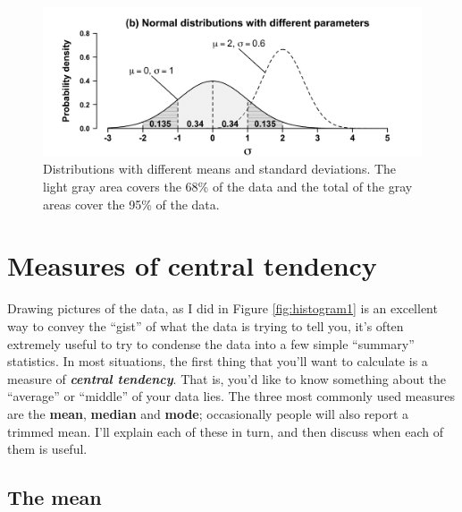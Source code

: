 \documentclass[
]{book}
\begin{document}
\begin{figure}
\centering
\includegraphics{./img/descriptives2/normal_distribution.png}
\caption{\label{fig:normalparameterdistributions}Distributions with different means and standard deviations. The light gray area covers the 68\% of the data and the total of the gray areas cover the 95\% of the data.}
\end{figure}

\hypertarget{centraltendency}{%
\section{Measures of central tendency}\label{centraltendency}}

Drawing pictures of the data, as I did in Figure \ref{fig:histogram1} is an excellent way to convey the ``gist'' of what the data is trying to tell you, it's often extremely useful to try to condense the data into a few simple ``summary'' statistics. In most situations, the first thing that you'll want to calculate is a measure of \textbf{\emph{central tendency}}. That is, you'd like to know something about the ``average'' or ``middle'' of your data lies. The three most commonly used measures are the \textbf{mean}, \textbf{median} and \textbf{mode}; occasionally people will also report a trimmed mean. I'll explain each of these in turn, and then discuss when each of them is useful.

\hypertarget{mean}{%
\subsection{The mean}\label{mean}}
\end{document}
